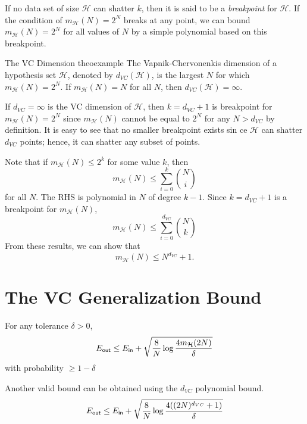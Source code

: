 \documentclass{tufte-handout}
\begin{document}
If no data set of size $\mathcal H$ can shatter $k$, then it is said to be a {\em breakpoint} for $\mathcal H$.
If the condition of $m_{\mathcal H}(N) = 2^N$ breaks at any point, we can bound $m_{\mathcal H}(N) = 2^N$  for all values of $N$ by a simple polynomial based on this breakpoint.

\begin{mydef}{The VC Dimension }{theoexample}
The Vapnik-Chervonenkis dimension of a hypothesis set $\mathcal H$, denoted by $d_{VC}(\mathcal H)$, is the largest $N$ for which $m_{\mathcal H}(N) = 2^N$. If $m_{\mathcal H}(N)=N $ for all $N$, then $d_{VC}(\mathcal H)=\infty$. 
 \end{mydef}
If  $d_{VC}=\infty$ is the VC dimension of $\mathcal H$, then $k=d_{VC}+1$ is  breakpoint for $m_{\mathcal H}(N) = 2^N$ since $m_{\mathcal H}(N) $ cannot be equal to $2^N$ for any $N>d_{VC}$ by definition. It is easy to see that no smaller breakpoint exists sin ce $\mathcal H$ can shatter $d_{VC}$ points; hence, it can shatter any subset of points.

Note that if $m_{\mathcal H}(N)\leq 2^k$ for some value $k$, then 
\begin{equation*}
m_{\mathcal H}(N) \leq \sum_{i=0}^{k} \binom{N}{i}
\end{equation*}
for all $N$. The RHS is polynomial in $N$ of degree $k-1$.  Since $k  = d_{VC} +1 $ is a breakpoint for $m_{\mathcal H}(N)$,
\begin{equation*}
m_{\mathcal H}(N) \leq \sum_{i=0}^{d_{VC}} \binom{N}{k}
\end{equation*}
From these results, we can show that 
\begin{equation*}
m_{\mathcal H}(N) \leq N^{d_{VC}} +1.
\end{equation*}

\section{The VC Generalization Bound }

For any tolerance $\delta >0$,
\begin{equation*}
E_{{\sf out}} \leq E_{{\sf in}} +\sqrt{\frac{8}{N} \log \frac{4m_{\mathcal H}(2N)}{\delta}}
\end{equation*}
with probability $\geq 1 - \delta $

Another valid bound can be obtained using the $d_{VC}$ polynomial bound. 
\begin{equation*}
E_{{\sf out}} \leq E_{{\sf in}} +\sqrt{\frac{8}{N} \log \frac{4((2N)^{d_{VC}} + 1)}{\delta}}
\end{equation*}
\end{document}
